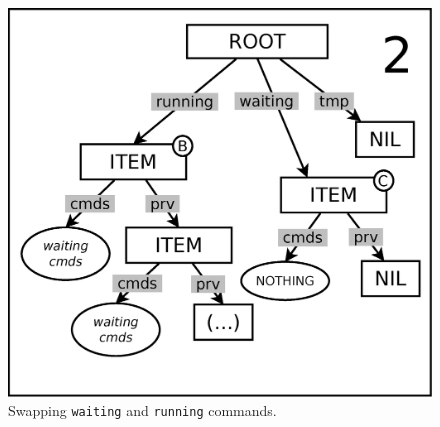 \documentclass{sig-alternate}
\newcommand{\code}[1] {{\small{\texttt{#1}}}}
\begin{document}
\begin{figure}[t]
\begin{minipage}[t]{0.33\linewidth}
\end{minipage}
\begin{minipage}[t]{0.33\linewidth}
\centering
\includegraphics[scale=0.23]{queue-12.eps}
\end{minipage}
\caption{
Swapping \code{waiting} and \code{running} commands.
\label{fig.queue-1}
}
\end{figure}
\end{document}
